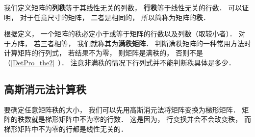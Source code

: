 

我们定义矩阵的\textbf{列秩}等于其线性无关的列数， \textbf{行秩}等于线性无关的行数． 可以证明， 对于任意尺寸的矩阵， 二者是相同的， 所以简称为矩阵的\textbf{秩}．

根据定义， 一个矩阵的秩必定小于或等于矩阵的行数以及列数（取较小者）． 对于方阵， 若三者相等， 我们就称其为\textbf{满秩矩阵}． 判断满秩矩阵的一种常用方法时计算矩阵的行列式， 若结果不为零， 则矩阵是满秩的， 否则不是（\autoref{DetPro_the2}~）． 注意非满秩的情况下行列式并不能判断秩具体是多少．


\subsection{高斯消元法计算秩}
要确定任意矩阵秩的大小， 我们可以先用高斯消元法将矩阵变换为梯形矩阵． 矩阵的秩数就是梯形矩阵中不为零的行数． 这是因为， 行变换并会不会改变秩， 而梯形矩阵中不为零的行都是线性无关的．
